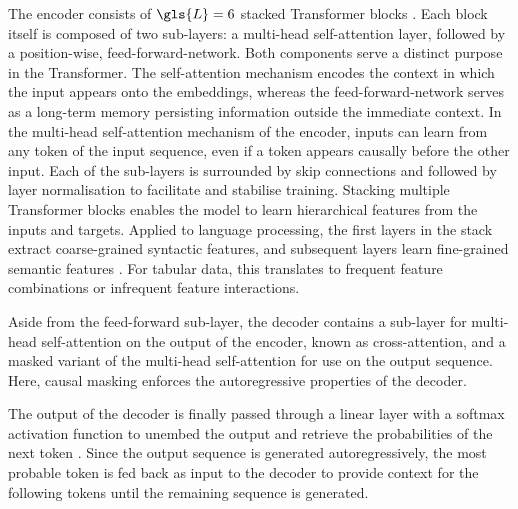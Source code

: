 The encoder consists of $\gls{L}=6$ stacked Transformer blocks \autocite[][6]{vaswaniAttentionAllYou2017}. Each block itself is composed of two sub-layers: a multi-head self-attention layer, followed by a position-wise, \gls{feed-forward-network}. Both components serve a distinct purpose in the Transformer. The self-attention mechanism encodes the context in which the input appears onto the \glspl{embedding}, whereas the \gls{feed-forward-network} serves as a long-term memory persisting information outside the immediate context. In the multi-head self-attention mechanism of the encoder, inputs can learn from any \gls{token} of the input sequence, even if a \gls{token} appears causally before the other input. Each of the sub-layers is surrounded by skip connections \autocite[][2]{heDeepResidualLearning2015} and followed by layer normalisation \autocite[][4]{baLayerNormalization2016} to facilitate and stabilise training. Stacking multiple Transformer blocks enables the model to learn hierarchical features from the inputs and targets. Applied to language processing, the first layers in the stack extract coarse-grained syntactic features, and subsequent layers learn fine-grained semantic features \autocites[][3651]{jawaharWhatDoesBERT2019}[][4596]{tenneyBERTRediscoversClassical2019}. For tabular data, this translates to frequent feature combinations or infrequent feature interactions.

Aside from the feed-forward sub-layer, the decoder contains a sub-layer for multi-head self-attention on the output of the encoder, known as cross-attention, and a masked variant of the multi-head self-attention for use on the output sequence. Here, causal masking enforces the autoregressive properties of the decoder.

The output of the decoder is finally passed through a linear layer with a softmax activation function to unembed the output and retrieve the probabilities of the next \gls{token} \autocite[][5]{vaswaniAttentionAllYou2017}. Since the output sequence is generated autoregressively, the most probable \gls{token} is fed back as input to the decoder to provide context for the following \glspl{token} until the remaining sequence is generated.

